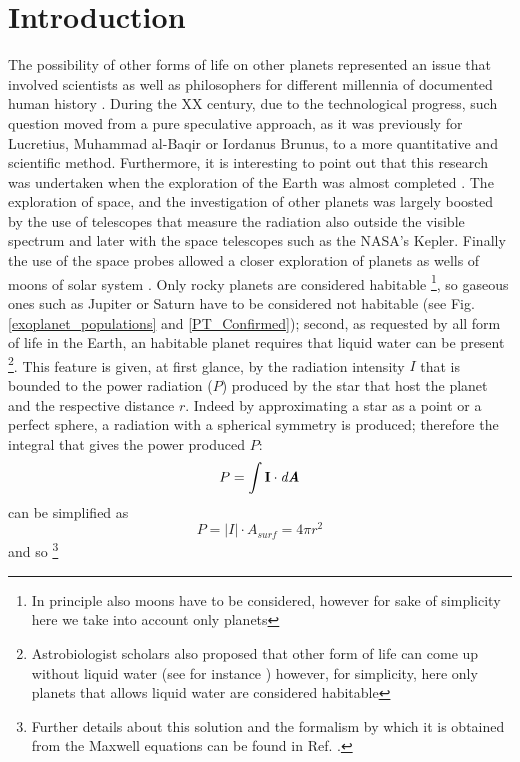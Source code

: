 \documentclass[
12pt, %
a4paper, %
oneside, %
headinclude,footinclude, %
BCOR5mm, %
]{scrartcl}
\begin{document}
\section{Introduction}
The possibility of other forms of life on other planets represented an issue that involved scientists as well as philosophers for different millennia of documented human history \cite{papagiannis1985historical}. During the XX century, due to the technological progress, such question moved from a pure speculative approach, as it was previously for Lucretius, Muhammad al-Baqir or Iordanus Brunus, to a more quantitative and scientific method. Furthermore, it is interesting to point out that this research was undertaken when the exploration of the Earth was almost completed \cite{fleming2001barrow}. The exploration of space, and the investigation of other planets was largely boosted by the use of telescopes that measure the radiation also outside the visible spectrum and later with the space telescopes such as the NASA's Kepler. Finally the use of the space probes allowed a closer exploration of planets as wells of moons of solar system \cite{space_probes}. 
Only rocky planets are considered habitable \footnote{In principle also moons have to be considered, however for sake of simplicity here we take into account only planets}, so gaseous ones such as Jupiter or Saturn have to be considered not habitable (see Fig. \ref{exoplanet_populations} and \ref{PT_Confirmed}); second, as requested by all form of life in the Earth, an habitable planet requires that liquid water can be present \cite{seager2013exoplanet,mckay2014requirements,rothschild2001life} \footnote{Astrobiologist scholars also proposed that other form of life can come up without liquid water (see for instance \cite{rahm2016polymorphism}) however, for simplicity, here only planets that allows liquid water are considered habitable}. This feature is given, at first glance, by the radiation intensity $I$ that is bounded to the power radiation ($P$) produced by the star that host the planet and the respective distance $r$. Indeed by approximating a star as a point or a perfect sphere, a radiation with a spherical symmetry is produced; therefore the integral that gives the power produced $P$: 
\begin{equation}
P=\int \textbf{I}\cdot \textit{d\textbf{A}}
\end{equation}
can be simplified as 
\begin{equation}
P=\lvert I \rvert \cdot A_{surf}=4\pi r^{2}
\end{equation}
and so  \footnote{Further details about this solution and the formalism by which it is obtained from the Maxwell equations can be found in Ref. \cite{feynman}.}
\end{document}
